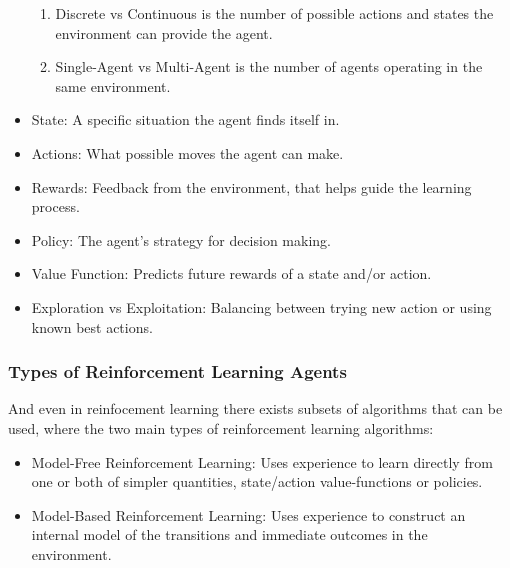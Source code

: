\begin{itemize}
\begin{enumerate}
                  \item Discrete vs Continuous is the number of possible actions and states the environment can provide the agent.
                  \item Single-Agent vs Multi-Agent is the number of agents operating in the same environment.
            \end{enumerate}
      \item State: A specific situation the agent finds itself in.
      \item Actions: What possible moves the agent can make.
      \item Rewards: Feedback from the environment, that helps guide the learning process.
      \item Policy: The agent's strategy for decision making.
      \item Value Function: Predicts future rewards of a state and/or action.
      \item Exploration vs Exploitation: Balancing between trying new action or using known best actions.
\end{itemize}


\subsubsection{Types of Reinforcement Learning Agents}
And even in reinfocement learning there exists subsets of algorithms that can be used, where
the two main types of reinforcement learning algorithms:
\begin{itemize}
      \item Model-Free Reinforcement Learning: Uses experience to learn directly from one or both of simpler quantities, state/action value-functions or policies.
      \item Model-Based Reinforcement Learning: Uses experience to construct an internal model of the 
      transitions and immediate outcomes in the environment.
\end{itemize}

